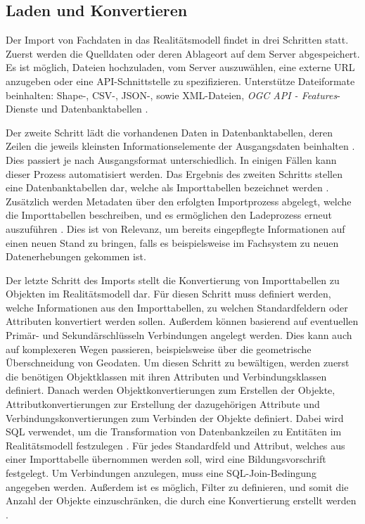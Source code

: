 \subsection{Laden und Konvertieren}
\label{sec:simplex-importer}

Der Import von Fachdaten in das Realitätsmodell findet in drei Schritten statt. Zuerst werden die Quelldaten oder deren Ablageort auf dem Server abgespeichert. Es ist möglich, Dateien hochzuladen, vom Server auszuwählen, eine externe \acs{URL} anzugeben oder eine \acs{API}-Schnittstelle zu spezifizieren. Unterstütze Dateiformate beinhalten: Shape-, \acs{CSV}-, \acs{JSON}-, sowie \acs{XML}-Dateien, \textit{OGC API - Features}-Dienste und Datenbanktabellen \parencite{simplex4datagmbhSimplex4TwIS}.

Der zweite Schritt lädt die vorhandenen Daten in Datenbanktabellen, deren Zeilen die jeweils kleinsten Informationselemente der Ausgangsdaten beinhalten \parencite{grossmannFachsystemeSchemaevolution2024}. Dies passiert je nach Ausgangsformat unterschiedlich. In einigen Fällen kann dieser Prozess automatisiert werden. Das Ergebnis des zweiten Schritts stellen eine Datenbanktabellen dar, welche als Importtabellen bezeichnet werden . Zusätzlich werden Metadaten über den erfolgten Importprozess abgelegt, welche die Importtabellen beschreiben, und es ermöglichen den Ladeprozess erneut auszuführen \parencite{grossmannFachsystemeSchemaevolution2024}. Dies ist von Relevanz, um bereits eingepflegte Informationen auf einen neuen Stand zu bringen, falls es beispielsweise im Fachsystem zu neuen Datenerhebungen gekommen ist.

Der letzte Schritt des Imports stellt die Konvertierung von Importtabellen zu Objekten im Realitätsmodell dar. Für diesen Schritt muss definiert werden, welche Informationen aus den Importtabellen, zu welchen Standardfeldern oder Attributen konvertiert werden sollen. Außerdem können basierend auf eventuellen Primär- und Sekundärschlüsseln Verbindungen angelegt werden. Dies kann auch auf komplexeren Wegen passieren, beispielsweise über die geometrische Überschneidung von Geodaten. Um diesen Schritt zu bewältigen, werden zuerst die benötigen Objektklassen mit ihren Attributen und Verbindungsklassen definiert. Danach werden Objektkonvertierungen zum Erstellen der Objekte, Attributkonvertierungen zur Erstellung der dazugehörigen Attribute und Verbindungskonvertierungen zum Verbinden der Objekte definiert. Dabei wird \acs{SQL} verwendet, um die Transformation von Datenbankzeilen zu Entitäten im Realitätsmodell festzulegen \parencite{grossmannFachsystemeSchemaevolution2024}. Für jedes Standardfeld und Attribut, welches aus einer Importtabelle übernommen werden soll, wird eine Bildungsvorschrift festgelegt. Um Verbindungen anzulegen, muss eine \acs{SQL}-Join-Bedingung angegeben werden. Außerdem ist es möglich, Filter zu definieren, und somit die Anzahl der Objekte einzuschränken, die durch eine Konvertierung erstellt werden \parencite{grossmannFachsystemeSchemaevolution2024}.
